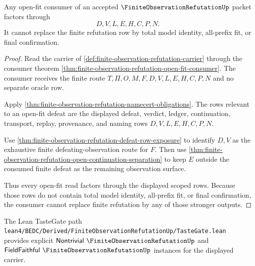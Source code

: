 \begin{theorem}
\label{thm:finite-observation-refutation-scoped-open-fit-nonescape}
Any open-fit consumer of an accepted $\FiniteObservationRefutationUp$ packet factors through
$$
D,V,L,E,H,C,P,N.
$$
It cannot replace the finite refutation row by total model identity, all-prefix fit, or final confirmation.
\end{theorem}
\begin{proof}
Read the carrier of \autoref{def:finite-observation-refutation-carrier} through the consumer theorem \autoref{thm:finite-observation-refutation-open-fit-consumer}. The consumer receives the finite route $T,\Pi,O,M,F,D,V,L,E,H,C,P,N$ and no separate oracle row.

Apply \autoref{thm:finite-observation-refutation-namecert-obligations}. The rows relevant to an open-fit defeat are the displayed defeat, verdict, ledger, continuation, transport, replay, provenance, and naming rows $D,V,L,E,H,C,P,N$.

Use \autoref{thm:finite-observation-refutation-defeat-row-exposure} to identify $D,V$ as the exhaustive finite defeating-observation route for $F$. Then use \autoref{thm:finite-observation-refutation-open-continuation-separation} to keep $E$ outside the consumed finite defeat as the remaining observation surface.

Thus every open-fit read factors through the displayed scoped rows. Because those rows do not contain total model identity, all-prefix fit, or final confirmation, the consumer cannot replace finite refutation by any of those stronger outputs.
\end{proof}



The Lean TasteGate path \texttt{lean4/BEDC/Derived/FiniteObservationRefutationUp/TasteGate.lean} provides explicit $\mathsf{Nontrivial}\ \FiniteObservationRefutationUp$ and $\mathsf{FieldFaithful}\ \FiniteObservationRefutationUp$ instances for the displayed carrier.

